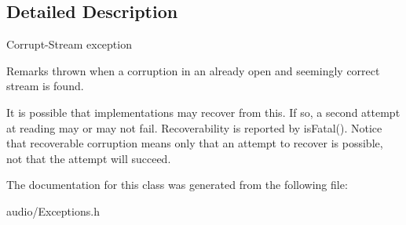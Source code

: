 \subsection{Detailed Description}
Corrupt-\/\+Stream exception \begin{DoxyRemark}{Remarks}
thrown when a corruption in an already open and seemingly correct stream is found. 
\end{DoxyRemark}
\begin{DoxyParagraph}{It is possible that implementations may recover from this. If so, a second attempt}
at reading may or may not fail. Recoverability is reported by is\+Fatal(). Notice that recoverable corruption means only that an attempt to recover is possible, not that the attempt will succeed. 
\end{DoxyParagraph}


The documentation for this class was generated from the following file\+:\begin{DoxyCompactItemize}
\item 
audio/Exceptions.\+h\end{DoxyCompactItemize}

